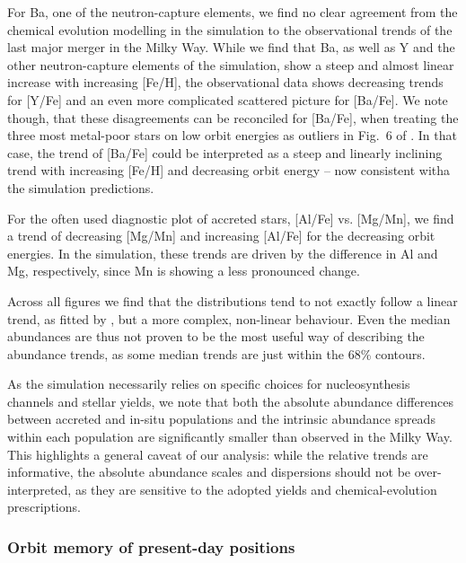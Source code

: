 \documentclass[fleqn,usenatbib]{mnras}
\begin{document}
For Ba, one of the neutron-capture elements, we find no clear agreement from the chemical evolution modelling in the simulation to the observational trends of the last major merger in the Milky Way. While we find that Ba, as well as Y and the other neutron-capture elements of the simulation, show a steep and almost linear increase with increasing [Fe/H], the observational data shows decreasing trends for [Y/Fe] and an even more complicated scattered picture for [Ba/Fe]. We note though, that these disagreements can be reconciled for [Ba/Fe], when treating the three most metal-poor stars on low orbit energies as outliers in Fig.~6 of \citet{Skuladottir2025}. In that case, the trend of [Ba/Fe] could be interpreted as a steep and linearly inclining trend with increasing [Fe/H] and decreasing orbit energy -- now consistent witha the simulation predictions.

For the often used diagnostic plot of accreted stars, [Al/Fe] vs. [Mg/Mn], we find a trend of decreasing [Mg/Mn] and increasing [Al/Fe] for the decreasing orbit energies. In the simulation, these trends are driven by the difference in Al and Mg, respectively, since Mn is showing a less pronounced change.

Across all figures we find that the distributions tend to not exactly follow a linear trend, as fitted by \citet{Skuladottir2025}, but a more complex, non-linear behaviour. Even the median abundances are thus not proven to be the most useful way of describing the abundance trends, as some median trends are just within the 68\% contours.

As the simulation necessarily relies on specific choices for nucleosynthesis channels and stellar yields, we note that both the absolute abundance differences between accreted and in-situ populations and the intrinsic abundance spreads within each population are significantly smaller than observed in the Milky Way. This highlights a general caveat of our analysis: while the relative trends are informative, the absolute abundance scales and dispersions should not be over-interpreted, as they are sensitive to the adopted yields and chemical-evolution prescriptions.

\subsubsection{Orbit memory of present-day positions}
\end{document}
